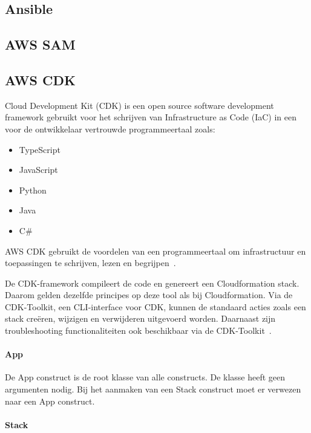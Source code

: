 \subsection{Ansible}
\label{sec:service-ansible}

\subsection{AWS SAM}
\label{sec:service-sam}

\subsection{AWS CDK}
\label{sec:service-cdk}

Cloud Development Kit (CDK) is een open source software development framework gebruikt voor het schrijven van Infrastructure as Code (IaC) in een voor de ontwikkelaar vertrouwde programmeertaal zoals:

\begin{itemize}
    \item TypeScript
    \item JavaScript
    \item Python
    \item Java
    \item C\#
\end{itemize}

AWS CDK gebruikt de voordelen van een programmeertaal om infrastructuur en toepassingen te schrijven, lezen en begrijpen~\autocite{Mansoor2014}.

De CDK-framework compileert de code en genereert een Cloudformation stack.
Daarom gelden dezelfde principes op deze tool als bij Cloudformation.
Via de CDK-Toolkit, een CLI-interface voor CDK, kunnen de standaard acties zoals een stack creëren, wijzigen en verwijderen uitgevoerd worden.
Daarnaast zijn troubleshooting functionaliteiten ook beschikbaar via de CDK-Toolkit~\autocite{Mansoor2014}.

\paragraph{App}

De App construct is de root klasse van alle constructs.
De klasse heeft geen argumenten nodig.
Bij het aanmaken van een Stack construct moet er verwezen naar een App construct.

\paragraph{Stack}

